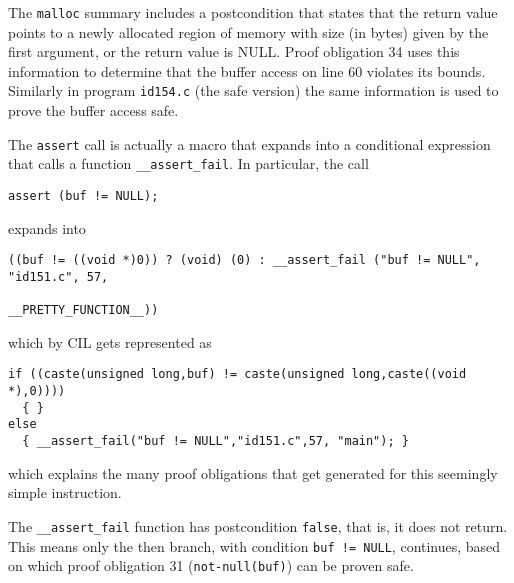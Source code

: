 \documentclass[11pt]{article}
\begin{document}
The {\tt malloc} summary includes a postcondition that states that the return value 
points to a newly allocated region of memory with size (in bytes) given by the 
first argument, or the return value is NULL. Proof obligation 34 uses this 
information to determine that the buffer access on line 60 violates its bounds. 
Similarly in program {\tt id154.c} (the safe version) the same information is used 
to prove the buffer access safe.

The {\tt assert} call is actually a macro that expands into a conditional expression 
that calls a function {\tt \_\_assert\_fail}. In particular, the call
\begin{verbatim}
assert (buf != NULL);
\end{verbatim}
expands into
\begin{small}
\begin{verbatim}
((buf != ((void *)0)) ? (void) (0) : __assert_fail ("buf != NULL", "id151.c", 57,
                                                    __PRETTY_FUNCTION__))
\end{verbatim}
\end{small}
which by CIL gets represented as
\begin{small}
\begin{verbatim}
if ((caste(unsigned long,buf) != caste(unsigned long,caste((void *),0))))
  { }
else
  { __assert_fail("buf != NULL","id151.c",57, "main"); }
\end{verbatim}
\end{small}
which explains the many proof obligations that get generated for this seemingly 
simple instruction.

The {\tt \_\_assert\_fail} function has postcondition {\tt false}, that is, it does not 
return. This means only the then branch, with condition {\tt buf != NULL}, continues, 
based on which proof obligation 31 ({\tt not-null(buf)}) can be proven safe.
\end{document}
